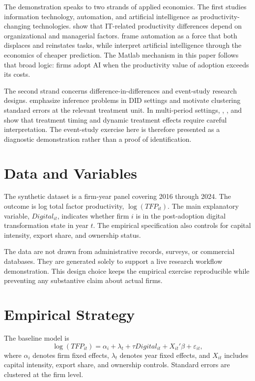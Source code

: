 \documentclass[11pt]{article}
\begin{document}
The demonstration speaks to two strands of applied economics. The first studies information technology, automation, and artificial intelligence as productivity-changing technologies. \citet{BloomSadunVanReenen2012} show that IT-related productivity differences depend on organizational and managerial factors. \citet{AcemogluRestrepo2019} frame automation as a force that both displaces and reinstates tasks, while \citet{AgrawalGansGoldfarb2019} interpret artificial intelligence through the economics of cheaper prediction. The Matlab mechanism in this paper follows that broad logic: firms adopt AI when the productivity value of adoption exceeds its costs.

The second strand concerns difference-in-differences and event-study research designs. \citet{BertrandDufloMullainathan2004} emphasize inference problems in DID settings and motivate clustering standard errors at the relevant treatment unit. In multi-period settings, \citet{CallawaySantAnna2021}, \citet{SunAbraham2021}, and \citet{GoodmanBacon2021} show that treatment timing and dynamic treatment effects require careful interpretation. The event-study exercise here is therefore presented as a diagnostic demonstration rather than a proof of identification.

\section{Data and Variables}

The synthetic dataset is a firm-year panel covering 2016 through 2024. The outcome is log total factor productivity, $\log(TFP_{it})$. The main explanatory variable, $Digital_{it}$, indicates whether firm $i$ is in the post-adoption digital transformation state in year $t$. The empirical specification also controls for capital intensity, export share, and ownership status.

The data are not drawn from administrative records, surveys, or commercial databases. They are generated solely to support a live research workflow demonstration. This design choice keeps the empirical exercise reproducible while preventing any substantive claim about actual firms.

\section{Empirical Strategy}

The baseline model is
\begin{equation}
\log(TFP_{it}) = \alpha_i + \lambda_t + \tau Digital_{it} + X_{it}'\beta + \varepsilon_{it},
\end{equation}
where $\alpha_i$ denotes firm fixed effects, $\lambda_t$ denotes year fixed effects, and $X_{it}$ includes capital intensity, export share, and ownership controls. Standard errors are clustered at the firm level.
\end{document}
